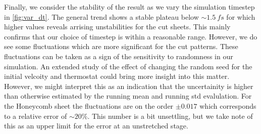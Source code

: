 Finally, we consider the stability of the result as we vary the simulation timestep in \cref{fig:var_dt}. The general trend shows a stable plateau below $\sim \SI{1.5}{fs}$ for which higher values reveals arrising unstabilities for the cut sheets. This mainly confirms that our choice of timestep is within a reasonable range. However, we do see some fluctuations which are more
significant for the cut patterns. These fluctuations can be taken as a sign of the sensitivity to randomness in our simulation. An extended study of the effect of changing the random seed for the initial velcoity and thermostat could bring more insight into this matter. However, we might interpret this as an indication that the uncertainity is higher than otherwise estimated by the running mean and running \acrshort{std} evalulation. For the Honeycomb sheet the fluctuations are on the order $\pm 0.017$ which corresponds to a relative error of $\sim 20\%$. This number is a bit unsettling, but we take note of this as an upper limit for the error at an unstretched stage. 






